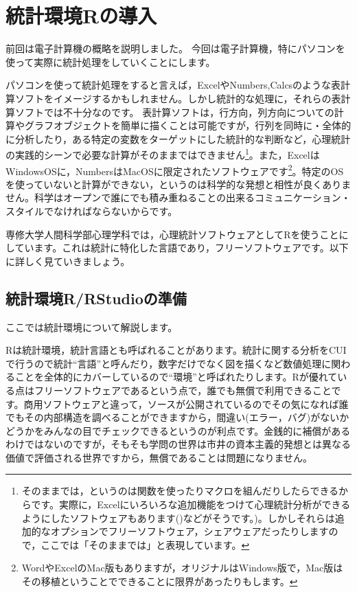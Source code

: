 \documentclass{ltjsbook}
\begin{document}
\VerbatimFootnotes
\chapter{統計環境Rの導入}
\label{b03_useR}
前回は電子計算機の概略を説明しました。
今回は電子計算機，特にパソコンを使って実際に統計処理をしていくことにします。

パソコンを使って統計処理をすると言えば，ExcelやNumbers,Calcsのような表計算ソフトをイメージするかもしれません。しかし統計的な処理に，それらの表計算ソフトでは不十分なのです。
表計算ソフトは，行方向，列方向についての計算やグラフオブジェクトを簡単に描くことは可能ですが，行列を同時に・全体的に分析したり，ある特定の変数をターゲットにした統計的な判断など，心理統計の実践的シーンで必要な計算がそのままではできません\footnote{そのままでは，というのは関数を使ったりマクロを組んだりしたらできるからです。実際に，Excelにいろいろな追加機能をつけて心理統計分析ができるようにしたソフトウェアもあります()\parencite{HAD}などがそうです。)。しかしそれらは追加的なオプションでフリーソフトウェア，シェアウェアだったりしますので，ここでは「そのままでは」と表現しています。}。また，ExcelはWindowsOSに，NumbersはMacOSに限定されたソフトウェアです\footnote{WordやExcelのMac版もありますが，オリジナルはWindows版で，Mac版はその移植ということでできることに限界があったりもします。}。特定のOSを使っていないと計算ができない，というのは科学的な発想と相性が良くありません。科学はオープンで誰にでも積み重ねることの出来るコミュニケーション・スタイルでなければならないからです。

専修大学人間科学部心理学科では，心理統計ソフトウェアとしてRを使うことにしています。これは統計に特化した言語であり，フリーソフトウェアです。以下に詳しく見ていきましょう。

\section{統計環境R/RStudioの準備}
ここでは統計環境について解説します。

Rは統計環境，統計言語とも呼ばれることがあります。統計に関する分析をCUIで行うので統計``言語''と呼んだり，数字だけでなく図を描くなど数値処理に関わることを全体的にカバーしているので``環境''と呼ばれたりします。Rが優れている点はフリーソフトウェアであるという点で，誰でも無償で利用できることです。商用ソフトウェアと違って，ソースが公開されているのでその気になれば誰でもその内部構造を調べることができますから，間違い(エラー，バグ)がないかどうかをみんなの目でチェックできるというのが利点です。金銭的に補償があるわけではないのですが，そもそも学問の世界は市井の資本主義的発想とは異なる価値で評価される世界ですから，無償であることは問題になりません。
\end{document}
